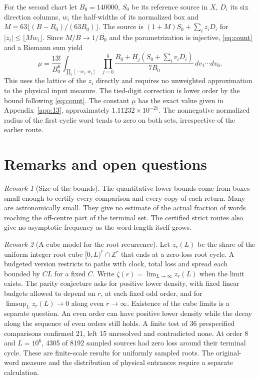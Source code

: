 \documentclass[11pt,reqno]{amsart}
\theoremstyle{remark}
\newtheorem*{remark}{Remark}
\newcommand{\ZZ}{\mathbb Z}
\begin{document}
For the second chart let \(B_0=140000\), \(S_0\) be its reference
source in \(X\), \(D_i\) its six direction columns, \(w_i\) the
half-widths of its normalized box and
\(M=63\lfloor(B-B_0)/(63B_0)\rfloor\).
The source is \((1+M)S_0+\sum_i z_iD_i\) for
\(|z_i|\le\lfloor Mw_i\rfloor\).
Since \(M/B\to1/B_0\) and the parametrization is injective,
\eqref{eq:count} and a Riemann sum yield
\begin{equation}\label{eq:mu}
 \mu=\frac{13!}{B_0^6}
 \int_{\prod_i[-w_i,w_i]}
      \prod_{j=0}^6\frac{B_0+H_j(S_0+\sum_i v_iD_i)}{7B_0}
       \,dv_1\cdots dv_6 .
\end{equation}
This uses the lattice of the \(z_i\) directly and requires no
unweighted approximation to the physical input measure.
The tied-digit correction is lower order by the bound following
\eqref{eq:count}. The constant \(\mu\) has the exact value given in
Appendix~\ref{app:13}, approximately \(1.11232\times10^{-21}\).
The nonnegative normalized radius of the first cyclic word tends
to zero on both sets, irrespective of the earlier route.

\section{Remarks and open questions}\label{sec:remarks}

\begin{remark}[Size of the bounds]
The quantitative lower bounds come from boxes small enough to
certify every comparison and every copy of each return. Many are
astronomically small. They give no estimate of the actual fraction
of words reaching the off-centre part of the terminal set.
The certified strict routes also give no asymptotic frequency
as the word length itself grows.
\end{remark}

\begin{remark}[A cube model for the root recurrence]
Let \(z_r(L)\) be the share of the uniform integer root cube
\([0,L)^r\cap\ZZ^r\) that ends at a zero-loss root cycle.
A budgeted version restricts to paths with clock, total loss
and spread each bounded by \(CL\) for a fixed \(C\).
Write \(\zeta(r)=\lim_{L\to\infty}z_r(L)\) when the limit exists.
The parity conjecture asks for positive lower density, with fixed
linear budgets allowed to depend on \(r\), at each fixed odd
order, and for \(\limsup_L z_r(L)\to0\) along even \(r\to\infty\).
Existence of the cube limits is a separate question.
An even order can have positive lower density while the decay
along the sequence of even orders still holds. A finite test of
36 prespecified comparisons confirmed 21, left 15 unresolved
and contradicted none. At order 8 and \(L=10^6\), 4305 of
8192 sampled sources had zero loss around their terminal cycle.
These are finite-scale results for uniformly sampled roots.
The original-word measure and the distribution of physical
entrances require a separate calculation.
\end{remark}
\end{document}
